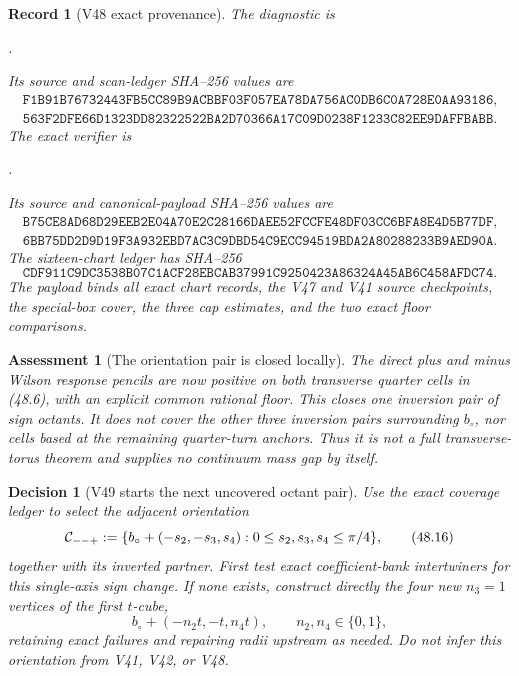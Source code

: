 \documentclass[11pt,oneside]{article}
\newtheorem{assessment}[theorem]{Assessment}
\newtheorem{record}[theorem]{Record}
\newtheorem{decision}[theorem]{Decision}
\theoremstyle{definition}
\theoremstyle{remark}
\begin{document}
\begin{record}[V48 exact provenance]
\label{rec:newv48-provenance}
The diagnostic is
\begin{center}
\footnotesize
{}.
\end{center}
Its source and scan-ledger SHA--256 values are
\[
\begin{gathered}
\texttt{F1B91B76732443FB5CC89B9ACBBF03F057EA78DA756AC0DB6C0A728E0AA93186},\\
\texttt{563F2DFE66D1323DD82322522BA2D70366A17C09D0238F1233C82EE9DAFFBABB}.
\end{gathered}                                         \tag{48.13}
\]
The exact verifier is
\begin{center}
\footnotesize
{}.
\end{center}
Its source and canonical-payload SHA--256 values are
\[
\begin{gathered}
\texttt{B75CE8AD68D29EEB2E04A70E2C28166DAEE52FCCFE48DF03CC6BFA8E4D5B77DF},\\
\texttt{6BB75DD2D9D19F3A932EBD7AC3C9DBD54C9ECC94519BDA2A80288233B9AED90A}.
\end{gathered}                                         \tag{48.14}
\]
The sixteen-chart ledger has SHA--256
\[
\texttt{CDF911C9DC3538B07C1ACF28EBCAB37991C9250423A86324A45AB6C458AFDC74}.
                                                               \tag{48.15}
\]
The payload binds all exact chart records, the V47 and V41 source
checkpoints, the special-box cover, the three cap estimates, and
the two exact floor comparisons.
\end{record}

\begin{assessment}[The orientation pair is closed locally]
\label{ass:newv48}
The direct plus and minus Wilson response pencils are now positive
on both transverse quarter cells in (48.6), with an explicit common
rational floor.  This closes one inversion pair of sign octants.
It does not cover the other three inversion pairs surrounding
\(b_\circ\), nor cells based at the remaining quarter-turn anchors.
Thus it is not a full transverse-torus theorem and supplies no
continuum mass gap by itself.
\end{assessment}

\begin{decision}[V49 starts the next uncovered octant pair]
\label{dec:newv48-next}
Use the exact coverage ledger to select the adjacent orientation
\[
 {\cal C}_{--+}:=
 \{b_\circ+(-s_2,-s_3,s_4):
             0\le s_2,s_3,s_4\le\pi/4\},              \tag{48.16}
\]
together with its inverted partner.  First test exact
coefficient-bank intertwiners for this single-axis sign change.
If none exists, construct directly the four new \(n_3=1\) vertices
of the first \(t\)-cube,
\[
 b_\circ+(-n_2t,-t,n_4t),\qquad n_2,n_4\in\{0,1\},
                                                               \tag{48.17}
\]
retaining exact failures and repairing radii upstream as needed.
Do not infer this orientation from V41, V42, or V48.
\end{decision}
\end{document}
